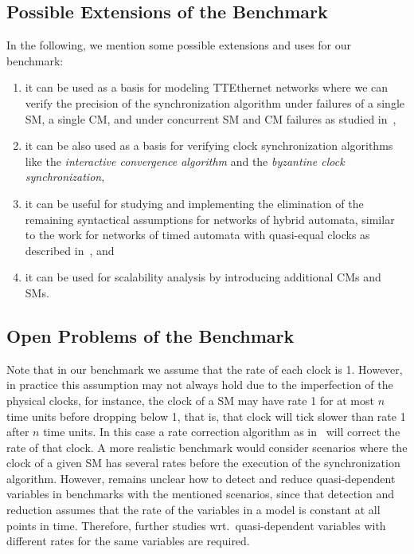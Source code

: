 \subsection{Possible Extensions of the Benchmark}

In the following, we mention some possible extensions and uses for our benchmark:
\begin{enumerate} 
\item it can be used as a basis for modeling TTEthernet networks where we can verify the
precision of the synchronization algorithm under failures of a single SM, a single CM, and
under concurrent SM and CM failures as studied in~\cite{Steiner2},   
\item it can be also used as a basis for verifying 
clock synchronization algorithms like the \emph{interactive convergence algorithm}\cite{lamport}
and the \emph{byzantine clock synchronization}\cite{lamport},
\item it can be useful for studying
and implementing the elimination of the remaining syntactical assumptions for
networks of hybrid automata, similar to the work for networks of timed automata
with quasi-equal clocks as described in~\cite{Herrera4}, and
\item  it can be used for scalability analysis 
by introducing additional CMs and SMs.
\end{enumerate} 

\subsection{Open Problems of the Benchmark}
Note that in our benchmark we assume that the rate of each clock is 1. However, in practice this assumption
may not always hold due to the imperfection of the physical clocks, for instance, the clock of a SM may have 
rate 1 for at most $n$ time units before dropping below 1, that is, that clock will tick slower than rate 1 after $n$ time units.
In this case a rate correction algorithm as in~\cite{Steiner3} will correct the rate of that clock. 
A more realistic benchmark would consider scenarios where the clock of a given SM has several rates before the execution
of the synchronization algorithm. However, remains unclear how to detect and reduce quasi-dependent variables in benchmarks with
the mentioned scenarios, since that detection and reduction assumes that the rate of the variables in a model is constant at all points in time. Therefore, further studies wrt.\ quasi-dependent variables with different rates for the same variables are required.      
 
